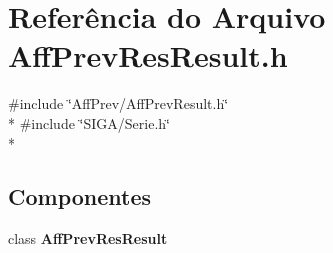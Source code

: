 \section{Referência do Arquivo Aff\+Prev\+Res\+Result.\+h}
\label{_aff_prev_res_result_8h}
{\ttfamily \#include \char`\"{}Aff\+Prev/\+Aff\+Prev\+Result.\+h\char`\"{}}\\*
{\ttfamily \#include \char`\"{}S\+I\+G\+A/\+Serie.\+h\char`\"{}}\\*
\subsection*{Componentes}
\begin{DoxyCompactItemize}
\item 
class {\bf Aff\+Prev\+Res\+Result}
\end{DoxyCompactItemize}
